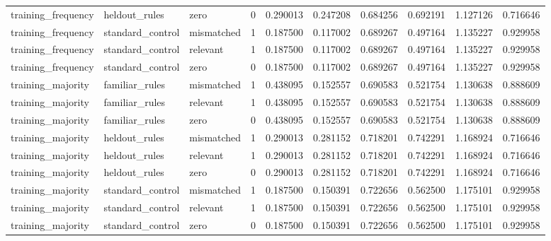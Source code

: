 \begin{tabular}{llllllllll}
training\_frequency & heldout\_rules & zero & 0 & 0.290013 & 0.247208 & 0.684256 & 0.692191 & 1.127126 & 0.716646 \\
training\_frequency & standard\_control & mismatched & 1 & 0.187500 & 0.117002 & 0.689267 & 0.497164 & 1.135227 & 0.929958 \\
training\_frequency & standard\_control & relevant & 1 & 0.187500 & 0.117002 & 0.689267 & 0.497164 & 1.135227 & 0.929958 \\
training\_frequency & standard\_control & zero & 0 & 0.187500 & 0.117002 & 0.689267 & 0.497164 & 1.135227 & 0.929958 \\
training\_majority & familiar\_rules & mismatched & 1 & 0.438095 & 0.152557 & 0.690583 & 0.521754 & 1.130638 & 0.888609 \\
training\_majority & familiar\_rules & relevant & 1 & 0.438095 & 0.152557 & 0.690583 & 0.521754 & 1.130638 & 0.888609 \\
training\_majority & familiar\_rules & zero & 0 & 0.438095 & 0.152557 & 0.690583 & 0.521754 & 1.130638 & 0.888609 \\
training\_majority & heldout\_rules & mismatched & 1 & 0.290013 & 0.281152 & 0.718201 & 0.742291 & 1.168924 & 0.716646 \\
training\_majority & heldout\_rules & relevant & 1 & 0.290013 & 0.281152 & 0.718201 & 0.742291 & 1.168924 & 0.716646 \\
training\_majority & heldout\_rules & zero & 0 & 0.290013 & 0.281152 & 0.718201 & 0.742291 & 1.168924 & 0.716646 \\
training\_majority & standard\_control & mismatched & 1 & 0.187500 & 0.150391 & 0.722656 & 0.562500 & 1.175101 & 0.929958 \\
training\_majority & standard\_control & relevant & 1 & 0.187500 & 0.150391 & 0.722656 & 0.562500 & 1.175101 & 0.929958 \\
training\_majority & standard\_control & zero & 0 & 0.187500 & 0.150391 & 0.722656 & 0.562500 & 1.175101 & 0.929958 \\
\hline
\end{tabular}

